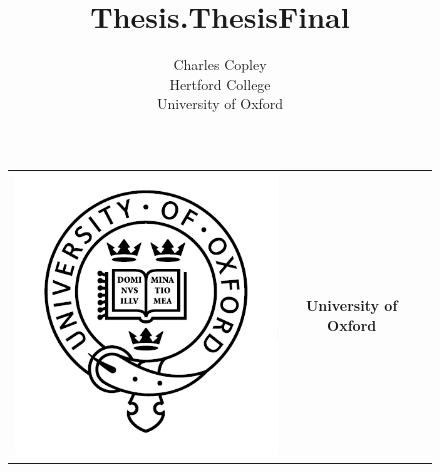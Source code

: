 \documentclass[english,a4paper,titlepage,12pt]{report}
\author{Charles Copley\\Hertford College\\University of Oxford}
\title{Thesis.ThesisFinal}
\begin{document}
%
\pagestyle{empty}
\begin{center}

\begin{figure}[ht]
\centering
\begin{tabular}{ccc}
\begin{minipage}{3cm}
\includegraphics[scale=0.25]{./images/logos/OxfordLogo.png}
\end{minipage}
&
\begin{minipage}{9cm}
\centering
\textbf{\large University of Oxford}
\vspace{1 cm}


\end{minipage}
\end{tabular}
\end{figure}
\end{center}
\end{document}
